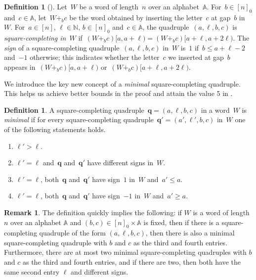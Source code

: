 \documentclass[12pt]{article}
\theoremstyle{plain}
\theoremstyle{definition}
\newtheorem{definition}[theorem]{Definition}
\newtheorem{remark}[theorem]{Remark}
\newcommand\N{\mathbb{N}}
\newcommand{\A}{\mathbb A}
\newcommand{\q}{\mathbf{q}}
\begin{document}
	\begin{definition}[\cite{HongZhang}]
		Let~$W$ be a word of length~$n$ over an alphabet~$\A$. For~$b\in[n]_0$ and~$c\in\A$, let~$W+_bc$ be the word obtained by inserting the letter~$c$ at gap~$b$ in~$W$. For~$a\in[n]$, $\ell\in\N$, $b\in[n]_0$ and~$c\in\A$, the quadruple~$(a,\ell,b,c)$ is \emph{square-completing in~$W$} if~$(W+_bc)[a,a+\ell)=(W+_bc)[a+\ell,a+2\ell)$. The \emph{sign} of a square-completing quadruple~$(a,\ell,b,c)$ in~$W$ is~$1$ if~$b\le a+\ell-2$ and~$-1$ otherwise; this indicates whether the letter~$c$ we inserted at gap~$b$ appears in~$(W+_bc)[a,a+\ell)$ or~$(W+_bc)[a+\ell,a+2\ell)$.
	\end{definition}
	
	We introduce the key new concept of a \emph{minimal} square-completing quadruple. This helps us achieve better bounds in the proof and attain the value 5 in .
	
	\begin{definition}
		A square-completing quadruple~$\q=(a,\ell,b,c)$ in a word~$W$ is \emph{minimal} if for every square-completing quadruple~$\q'=(a',\ell',b,c)$ in~$W$ one of the following statements holds.
		\begin{enumerate}[label=(M\arabic{*})]
			\item \label{item:mscq-min-ell} $\ell'>\ell$.
			\item \label{item:mscq-same-ell-split-signs} $\ell'=\ell$ and~$\q$ and~$\q'$ have different signs in~$W$.
			\item \label{item:mscq-same-ell-sign-positive} $\ell'=\ell$, both~$\q$ and~$\q'$ have sign~$1$ in~$W$ and~$a'\le a$.
			\item \label{item:mscq-same-ell-sign-negative} $\ell'=\ell$, both~$\q$ and~$\q'$ have sign~$-1$ in~$W$ and~$a'\ge a$.
		\end{enumerate}
	\end{definition}
	\begin{remark}
		The definition quickly implies the following:
		if $W$ is a word of length $n$ over an alphabet $\A$ and $(b,c)\in [n]_0\times \A$ is fixed, then if there is a square-completing quadruple of the form $(a,\ell,b,c)$, then there is also a minimal square-completing quadruple with $b$ and $c$ as the third and fourth entries. Furthermore, there are at most two minimal square-completing quadruples with $b$ and $c$ as the third and fourth entries, and if there are two, then both have the same second entry $\ell$ and different signs.
	\end{remark}
	
\end{document}
